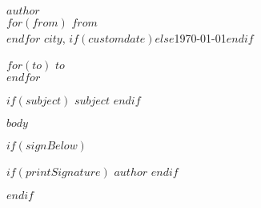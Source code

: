 \documentclass[$fontsize$, a4paper, $lang$]{article}
\newlength{\addresswidth}
\begin{document}
\small


\begin{FlushRight}
  \begin{minipage}{\addresswidth}
    $author$\\
    $for(from)$
      $from$\\
    $endfor$
    \vspace{0.1cm}$city$, $if(customdate)$$else$\today$endif$
  \end{minipage}
\end{FlushRight}


\vspace{1em}

\normalsize 
$for(to)$
$to$\\
$endfor$

\vspace{3em}

$if(subject)$
  \textbf{$subject$}
$endif$

\vspace{1em}
$body$

$if(signBelow)$
\begin{FlushRight}
  $if(printSignature)$
    $author$
  $endif$
\end{FlushRight}

$endif$
\end{document}
